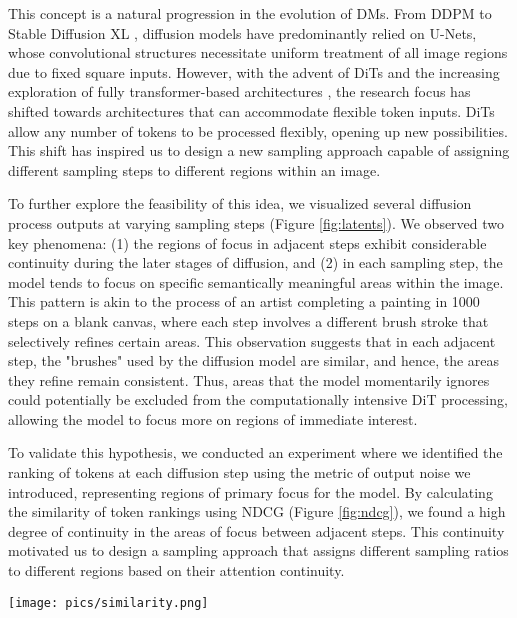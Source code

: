 This concept is a natural progression in the evolution of DMs. From DDPM \cite{Ho2020diffusion} to Stable Diffusion XL \cite{podell2023sdxlimprovinglatentdiffusion}, diffusion models have predominantly relied on U-Nets, whose convolutional structures \cite{ronneberger2015u} necessitate uniform treatment of all image regions due to fixed square inputs. However, with the advent of DiTs \cite{William2023DiT} and the increasing exploration of fully transformer-based architectures \cite{vaswani2017attention}, the research focus has shifted towards architectures that can accommodate flexible token inputs. DiTs allow any number of tokens to be processed flexibly, opening up new possibilities. This shift has inspired us to design a new sampling approach capable of assigning different sampling steps to different regions within an image.

To further explore the feasibility of this idea, we visualized several diffusion process outputs at varying sampling steps (Figure \ref{fig:latents}). We observed two key phenomena: (1) the regions of focus in adjacent steps exhibit considerable continuity during the later stages of diffusion, and (2) in each sampling step, the model tends to focus on specific semantically meaningful areas within the image. This pattern is akin to the process of an artist completing a painting in 1000 steps on a blank canvas, where each step involves a different brush stroke that selectively refines certain areas. This observation suggests that in each adjacent step, the "brushes" used by the diffusion model are similar, and hence, the areas they refine remain consistent. Thus, areas that the model momentarily ignores could potentially be excluded from the computationally intensive DiT processing, allowing the model to focus more on regions of immediate interest.

To validate this hypothesis, we conducted an experiment where we identified the ranking of tokens at each diffusion step using the metric of output noise we introduced, representing regions of primary focus for the model. By calculating the similarity of token rankings using NDCG (Figure \ref{fig:ndcg}), we found a high degree of continuity in the areas of focus between adjacent steps. This continuity motivated us to design a sampling approach that assigns different sampling ratios to different regions based on their attention continuity.


\begin{figure*}[htbp]
    \centering
            \texttt{[image: pics/similarity.png]}
        \caption{Visualization of predicted noise of each step. DiT model focuses on certain regions during each step and the change in focus is continuous across steps.}
        \label{fig:latents}
\end{figure*}

